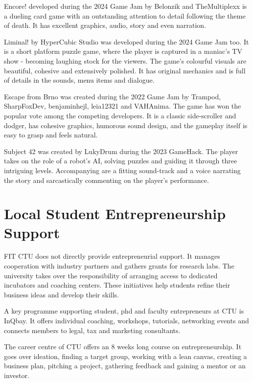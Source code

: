 Encore! developed during the 2024 Game Jam by Belonzik and TheMultiplexx is a dueling  card game with an outstanding attention to detail following the theme of death. It has excellent graphics, audio, story and even narration.

Liminal! by HyperCubic Studio was developed during the 2024 Game Jam too. It is a short platform puzzle game, where the player is captured in a maniac’s TV show - becoming laughing stock for the viewers. The game’s colourful visuals are beautiful, cohesive and extensively polished. It has original mechanics and is full of details in the sounds, menu items and dialogue.

Escape from Brno was created during the 2022 Game Jam by Trampod, SharpFoxDev, benjaminhejl, leia12321 and VAHAnima. The game has won the popular vote among the competing developers. It is a classic side-scroller and dodger, has cohesive graphics, humorous sound design, and the gameplay itself is easy to grasp and feels natural.

Subject 42 was created by LukyDrum during the 2023 GameHack. The player takes on the role of a robot’s AI, solving puzzles and guiding it through three intriguing levels. Accompanying are a fitting sound-track and a voice narrating the story and sarcastically commenting on the player’s performance.

\section{Local Student Entrepreneurship Support}
FIT CTU does not directly provide entrepreneurial support. It manages cooperation with industry partners and gathers grants for research labs. The university takes over the responsibility of arranging access to dedicated incubators and coaching centers. These initiatives help students refine their business ideas and develop their skills.

A key programme supporting student, phd and faculty entrepreneurs at CTU is InQbay. It offers individual coaching, workshops, tutorials, networking events and connects members to legal, tax and marketing consultants.

The career centre of CTU offers an 8 weeks long course on entrepreneurship. It goes over ideation, finding a target group, working with a lean canvas, creating a business plan, pitching a project, gathering feedback and gaining a mentor or an investor.